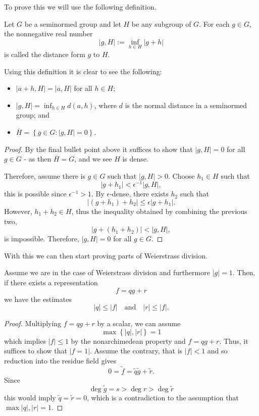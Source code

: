 To prove this we will use the following definition.

\begin{definition}
  Let $G$ be a seminormed group and let $H$ be any subgroup of $G$. For each $g \in G$, the nonnegative
  real number
  \[
  \lvert g, H \rvert := \inf_{h \in H} \lvert g + h \rvert
  \]
  is called the distance form $g$ to $H$.
\end{definition}

Using this definition it is clear to see the following:
\begin{itemize}
  \item $\lvert a + h, H \rvert = \lvert a, H \rvert$ for all $h \in H$;
  \item $\lvert g, H \rvert = \inf_{h \in H} d(a,h)$, where $d$ is the normal distance in a seminormed
    group; and
  \item $\overline{H} = \left\{ g \in G : \lvert g, H \rvert = 0 \right\}$.
\end{itemize}

\begin{proof}
  By the final bullet point above it suffices to show that $\lvert g, H \rvert = 0$ for all $g \in G$
  - as then $\overline{H} = G$, and we see $H$ is dense.

  Therefore, assume there is $g \in G$ such that $\lvert g, H \rvert > 0.$ Choose $h_1 \in H$ such that
  \[
    \lvert g + h_1 \rvert < \epsilon^{-1} \lvert g, H \rvert,
  \]
  this is possible since $\epsilon^{-1} > 1.$
  By $\epsilon$-dense, there exists $h_2$ such that
  \[
  \lvert (g + h_1) + h_2 \rvert \leq \epsilon \lvert g + h_1 \rvert.
  \]
  However, $h_1 + h_2 \in H$, thus the inequality obtained by combining the previous two,
  \[
    \lvert g + (h_1 + h_2) \rvert < \lvert g, H \rvert,
  \]
  is impossible. Therefore, $\lvert g, H \rvert = 0$ for all $g \in G$.
\end{proof}

With this we can then start proving parts of Weierstrass division.

\begin{lemma}\label{WD_bounds}
  Assume we are in the case of Weierstrass division and furthermore $\lvert g \rvert = 1$. Then, if
  there exists a representation
  \[
    f = q g + r
  \]
  we have the estimates
  \[
    \lvert q \rvert \leq \lvert f \rvert \quad \text{and} \quad \lvert r \rvert \leq \lvert f \rvert.
  \]
\end{lemma}

\begin{proof}
  Multiplying $f = q g + r$ by a scalar, we can assume
  \[
    \max \left\{ \lvert q \rvert, \lvert r \rvert \right\} = 1
  \]
  which implies $\lvert f \rvert \leq 1$ by the nonarchimedean property and $f = q g + r$.
  Thus, it suffices to show that $\lvert f = 1 \rvert.$ Assume the contrary, that is $\lvert f \rvert < 1$
  and so reduction into the residue field gives
  \[
    0 = \tilde{f} = \tilde{q} \tilde{g} + \tilde{r}.
  \]
  Since
  \[
    \deg \tilde{g} = s > \deg r > \deg \tilde{r}
  \]
  this would imply $\tilde{q} = \tilde{r} = 0$, which is a contradiction to the assumption that
  $\max {\lvert q \rvert, \lvert r \rvert} = 1$.
\end{proof}

